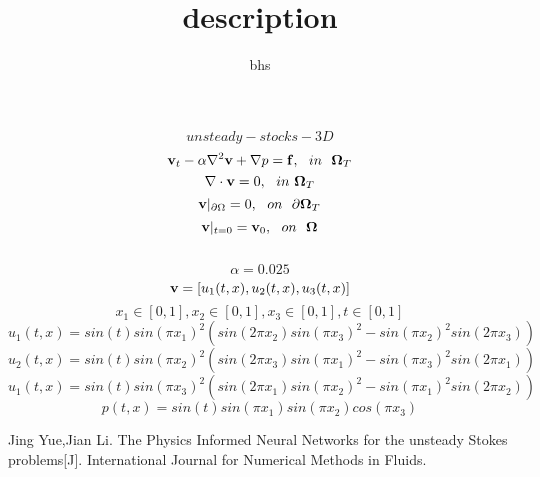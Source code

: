 \documentclass[12pt]{amsart}
\title{description}
\author{bhs}
\begin{document}
\maketitle

$$unsteady-stocks-3D$$
$$\bold v_{t}- \alpha \nabla^{2} \bold v+ \nabla p  = \bold f,\ \  in \ \ \bold  \Omega_{T}$$
$$\nabla \cdot \bold v=0,\ \ in \ \bold \Omega_{T}$$
$$\bold v |_{\partial\Omega}=0,\ \ on \ \ \partial \bold \Omega_{T}$$
$$\bold v |_{t=0}=\bold v_{0},\ \ on \ \ \bold \Omega$$ \\
$$\alpha=0.025$$
$$\bold v=[u_{1}(t,x),u_{2}(t,x),u_{3}(t,x)]$$
$$x_{1}\in [0,1] ,x_{2} \in [0,1],x_{3} \in [0,1],t \in [0,1]$$
$$u_{1}(t,x)=sin(t)sin(\pi x_{1})^{2}(sin(2 \pi x_{2})sin(\pi x_{3})^{2}-sin(\pi x_{2})^{2}sin(2 \pi x_{3}))$$
$$u_{2}(t,x)=sin(t)sin(\pi x_{2})^{2}(sin(2 \pi x_{3})sin(\pi x_{1})^{2}-sin(\pi x_{3})^{2}sin(2 \pi x_{1}))$$
$$u_{1}(t,x)=sin(t)sin(\pi x_{3})^{2}(sin(2 \pi x_{1})sin(\pi x_{2})^{2}-sin(\pi x_{1})^{2}sin(2 \pi x_{2}))$$
$$p(t,x)=sin(t)sin(\pi x_{1})sin(\pi x_{2})cos(\pi x_{3})$$



\begin{thebibliography}{10}
Jing Yue,Jian Li. The Physics Informed Neural Networks for the unsteady Stokes problems[J]. International Journal for Numerical Methods in Fluids.
\end{thebibliography}
\end{document}
